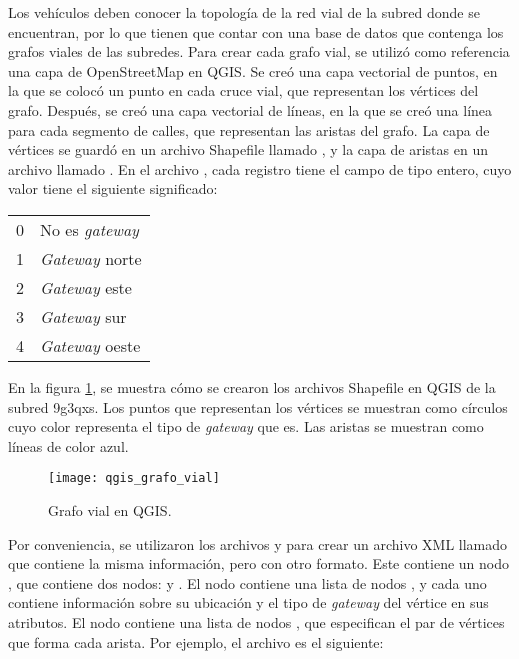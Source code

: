 \begin{sloppypar}
Los vehículos deben conocer la topología de la red vial de la subred donde se
encuentran, por lo que tienen que contar con una base de datos que contenga los
grafos viales de las subredes. Para crear cada grafo vial, se utilizó como
referencia una capa de OpenStreetMap en QGIS. Se creó una capa vectorial de
puntos, en la que se colocó un punto en cada cruce vial, que representan los
vértices del grafo. Después, se creó una capa vectorial de líneas, en la que se
creó una línea para cada segmento de calles, que representan las aristas del
grafo. La capa de vértices se guardó en un archivo Shapefile llamado
, y la capa de aristas en un archivo llamado
. En el archivo , cada registro tiene el
campo  de tipo entero, cuyo valor tiene el siguiente significado:
\end{sloppypar}

\begin{tabular}{ r l }
0 & No es \textit{gateway} \\
1 & \textit{Gateway} norte \\
2 & \textit{Gateway} este \\
3 & \textit{Gateway} sur \\
4 & \textit{Gateway} oeste \\
\end{tabular}

En la figura \ref{fig:qgis_grafo_vial}, se muestra cómo se crearon los
archivos Shapefile en QGIS de la subred 9g3qxs. Los puntos que representan los
vértices se muestran como círculos cuyo color representa el tipo de
\textit{gateway} que es. Las aristas se muestran como líneas de color azul.

\begin{figure}[th!]
\centering
\texttt{[image: qgis\_grafo\_vial]}
\decoRule
\caption[Grafo vial en QGIS]{Grafo vial en QGIS.}
\label{fig:qgis_grafo_vial}
\end{figure}

Por conveniencia, se utilizaron los archivos  y
 para crear un archivo XML llamado  que contiene la misma información, pero con otro formato. Este
contiene un nodo , que contiene dos nodos:  y
. El nodo  contiene una lista de nodos
, y cada uno contiene información sobre su ubicación y el tipo de
\textit{gateway} del vértice en sus atributos. El nodo  contiene
una lista de nodos , que especifican el par de vértices que forma
cada arista. Por ejemplo, el archivo  es el
siguiente:

